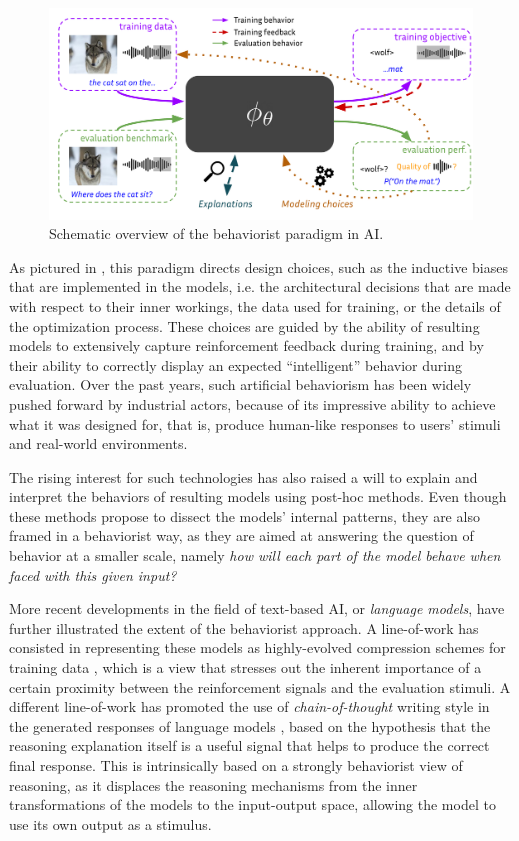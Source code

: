 \begin{figure}[ht]
  \centering
  \includegraphics[width=0.9\linewidth]{sources/imgs/behaviorist_schema.pdf}
  \caption{Schematic overview of the behaviorist paradigm in AI.}
  \label{fig:behaviorist}
\end{figure}

As pictured in , this paradigm directs design choices, such as the inductive biases that are implemented in the models, i.e. the architectural decisions that are made with respect to their inner workings, the data used for training, or the details of the optimization process. These choices are guided by the ability of resulting models to extensively capture reinforcement feedback during training, and by their ability to correctly display an expected ``intelligent'' behavior during evaluation. Over the past years, such artificial behaviorism has been widely pushed forward by industrial actors, because of its impressive ability to achieve what it was designed for, that is, produce human-like responses to users' stimuli and real-world environments. 

The rising interest for such technologies has also raised a will to explain and interpret the behaviors of resulting models using post-hoc methods. Even though these methods propose to dissect the models' internal patterns, they are also framed in a behaviorist way, as they are aimed at answering the question of behavior at a smaller scale, namely \textit{how will each part of the model behave when faced with this given input?}

More recent developments in the field of text-based AI, or \textit{language models}, have further illustrated the extent of the behaviorist approach. A line-of-work has consisted in representing these models as highly-evolved compression schemes for training data \citep{huang2024compression,deletang2024language}, which is a view that stresses out the inherent importance of a certain proximity between the reinforcement signals and the evaluation stimuli. A different line-of-work has promoted the use of \textit{chain-of-thought} writing style in the generated responses of language models \citep{wei2022chain}, based on the hypothesis that the reasoning explanation itself is a useful signal that helps to produce the correct final response. This is intrinsically based on a strongly behaviorist view of reasoning, as it displaces the reasoning mechanisms from the inner transformations of the models to the input-output space, allowing the model to use its own output as a stimulus.

